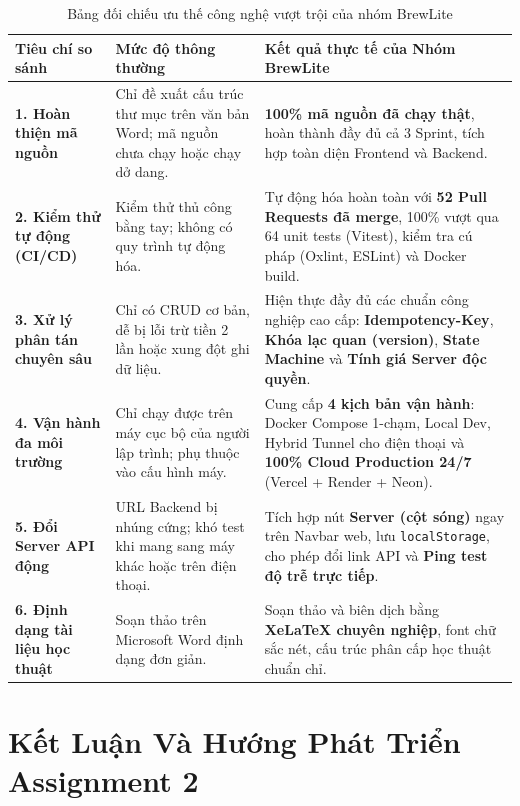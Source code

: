 \documentclass[12pt, a4paper]{article}
\begin{document}
\begin{table}[H]
\centering
\small
{}
\begin{tabularx}{\textwidth}{@{}L{3.3cm} Y Y@{}}
\color{white}\textbf{Tiêu chí so sánh} & \color{white}\textbf{Mức độ thông thường} & \color{white}\textbf{Kết quả thực tế của Nhóm BrewLite} \\
\midrule
\textbf{1. Hoàn thiện mã nguồn} &
Chỉ đề xuất cấu trúc thư mục trên văn bản Word; mã nguồn chưa chạy hoặc chạy dở dang. &
\textbf{100\% mã nguồn đã chạy thật}, hoàn thành đầy đủ cả 3 Sprint, tích hợp toàn diện Frontend và Backend. \\
\textbf{2. Kiểm thử tự động (CI/CD)} &
Kiểm thử thủ công bằng tay; không có quy trình tự động hóa. &
Tự động hóa hoàn toàn với \textbf{52 Pull Requests đã merge}, 100\% vượt qua 64 unit tests (Vitest), kiểm tra cú pháp (Oxlint, ESLint) và Docker build. \\
\textbf{3. Xử lý phân tán chuyên sâu} &
Chỉ có CRUD cơ bản, dễ bị lỗi trừ tiền 2 lần hoặc xung đột ghi dữ liệu. &
Hiện thực đầy đủ các chuẩn công nghiệp cao cấp: \textbf{Idempotency-Key}, \textbf{Khóa lạc quan (version)}, \textbf{State Machine} và \textbf{Tính giá Server độc quyền}. \\
\textbf{4. Vận hành đa môi trường} &
Chỉ chạy được trên máy cục bộ của người lập trình; phụ thuộc vào cấu hình máy. &
Cung cấp \textbf{4 kịch bản vận hành}: Docker Compose 1-chạm, Local Dev, Hybrid Tunnel cho điện thoại và \textbf{100\% Cloud Production 24/7} (Vercel + Render + Neon). \\
\textbf{5. Đổi Server API động} &
URL Backend bị nhúng cứng; khó test khi mang sang máy khác hoặc trên điện thoại. &
Tích hợp nút \textbf{Server (cột sóng)} ngay trên Navbar web, lưu \texttt{localStorage}, cho phép đổi link API và \textbf{Ping test độ trễ trực tiếp}. \\
\textbf{6. Định dạng tài liệu học thuật} &
Soạn thảo trên Microsoft Word định dạng đơn giản. &
Soạn thảo và biên dịch bằng \textbf{XeLaTeX chuyên nghiệp}, font chữ sắc nét, cấu trúc phân cấp học thuật chuẩn chỉ. \\
\bottomrule
\end{tabularx}
\caption{Bảng đối chiếu ưu thế công nghệ vượt trội của nhóm BrewLite}
\end{table}

\section{Kết Luận Và Hướng Phát Triển Assignment 2}
\end{document}
